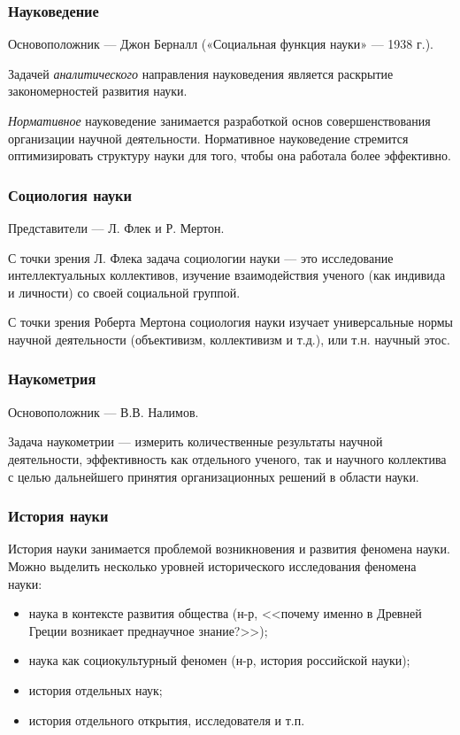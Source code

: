 \subsubsection{Науковедение}

Основоположник --- Джон Берналл («Социальная функция науки» --- 1938 г.).

Задачей \textit{аналитического} направления науковедения является раскрытие закономерностей развития науки. 

\textit{Нормативное} науковедение занимается разработкой основ совершенствования организации научной деятельности. Нормативное науковедение стремится оптимизировать структуру науки для того, чтобы она работала более эффективно. 

\subsubsection{Социология науки}

Представители --- Л. Флек и Р. Мертон.

С точки зрения Л. Флека задача социологии науки --- это исследование интеллектуальных коллективов, изучение взаимодействия ученого (как индивида и личности) со своей социальной группой.

С точки зрения Роберта Мертона социология науки изучает универсальные нормы научной деятельности (объективизм, коллективизм и т.д.), или т.н. научный этос. 


\subsubsection{Наукометрия}

Основоположник --- В.В. Налимов.

Задача наукометрии --- измерить количественные результаты научной деятельности, эффективность как отдельного ученого, так и научного коллектива с целью дальнейшего принятия организационных решений в области науки.

\subsubsection{История науки}

История науки занимается проблемой возникновения и развития феномена науки. Можно выделить несколько уровней исторического исследования феномена науки:
\begin{itemize}
    \item наука в контексте развития общества (н-р, <<почему именно в Древней Греции возникает преднаучное знание?>>);
    \item наука как социокультурный феномен (н-р, история российской науки);
    \item история отдельных наук;
    \item история отдельного открытия, исследователя и т.п.
\end{itemize}

